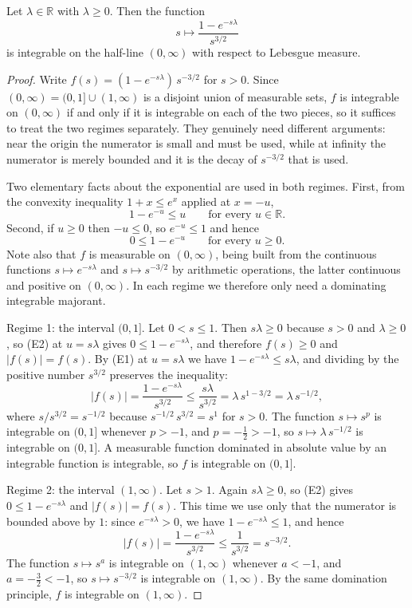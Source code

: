 \begin{lemma}
Let $\lambda \in \mathbb{R}$ with $\lambda \geq 0$.  Then the function
\[
  s \longmapsto \frac{1 - e^{-s\lambda}}{s^{3/2}}
\]
is integrable on the half-line $(0,\infty)$ with respect to Lebesgue measure.
\end{lemma}
\begin{proof}
Write $f(s) = (1 - e^{-s\lambda})\,s^{-3/2}$ for $s > 0$.  Since
$(0,\infty) = (0,1] \cup (1,\infty)$ is a disjoint union of measurable sets, $f$
is integrable on $(0,\infty)$ if and only if it is integrable on each of the two
pieces, so it suffices to treat the two regimes separately.  They genuinely need
different arguments: near the origin the numerator is small and must be used,
while at infinity the numerator is merely bounded and it is the decay of
$s^{-3/2}$ that is used.

Two elementary facts about the exponential are used in both regimes.  First, from
the convexity inequality $1 + x \leq e^{x}$ applied at $x = -u$,
\[
  1 - e^{-u} \leq u \qquad \text{for every } u \in \mathbb{R}. \tag{E1}
\]
Second, if $u \geq 0$ then $-u \leq 0$, so $e^{-u} \leq 1$ and hence
\[
  0 \leq 1 - e^{-u} \qquad \text{for every } u \geq 0. \tag{E2}
\]
Note also that $f$ is measurable on $(0,\infty)$, being built from the continuous
functions $s \mapsto e^{-s\lambda}$ and $s \mapsto s^{-3/2}$ by arithmetic
operations, the latter continuous and positive on $(0,\infty)$.  In each regime
we therefore only need a dominating integrable majorant.

Regime 1: the interval $(0,1]$.  Let $0 < s \leq 1$.  Then $s\lambda \geq 0$
because $s > 0$ and $\lambda \geq 0$, so (E2) at $u = s\lambda$ gives
$0 \leq 1 - e^{-s\lambda}$, and therefore $f(s) \geq 0$ and $|f(s)| = f(s)$.  By
(E1) at $u = s\lambda$ we have $1 - e^{-s\lambda} \leq s\lambda$, and dividing by
the positive number $s^{3/2}$ preserves the inequality:
\[
  |f(s)| = \frac{1 - e^{-s\lambda}}{s^{3/2}}
    \leq \frac{s\lambda}{s^{3/2}}
    = \lambda\, s^{1 - 3/2}
    = \lambda\, s^{-1/2} ,
\]
where $s/s^{3/2} = s^{-1/2}$ because $s^{-1/2}\,s^{3/2} = s^{1}$ for $s > 0$.
The function $s \mapsto s^{p}$ is integrable on $(0,1]$ whenever $p > -1$, and
$p = -\tfrac12 > -1$, so $s \mapsto \lambda\,s^{-1/2}$ is integrable on $(0,1]$.
A measurable function dominated in absolute value by an integrable function is
integrable, so $f$ is integrable on $(0,1]$.

Regime 2: the interval $(1,\infty)$.  Let $s > 1$.  Again $s\lambda \geq 0$, so
(E2) gives $0 \leq 1 - e^{-s\lambda}$ and $|f(s)| = f(s)$.  This time we use only
that the numerator is bounded above by $1$: since $e^{-s\lambda} > 0$, we have
$1 - e^{-s\lambda} \leq 1$, and hence
\[
  |f(s)| = \frac{1 - e^{-s\lambda}}{s^{3/2}} \leq \frac{1}{s^{3/2}}
    = s^{-3/2} .
\]
The function $s \mapsto s^{a}$ is integrable on $(1,\infty)$ whenever $a < -1$,
and $a = -\tfrac32 < -1$, so $s \mapsto s^{-3/2}$ is integrable on
$(1,\infty)$.  By the same domination principle, $f$ is integrable on
$(1,\infty)$.


\end{proof}
